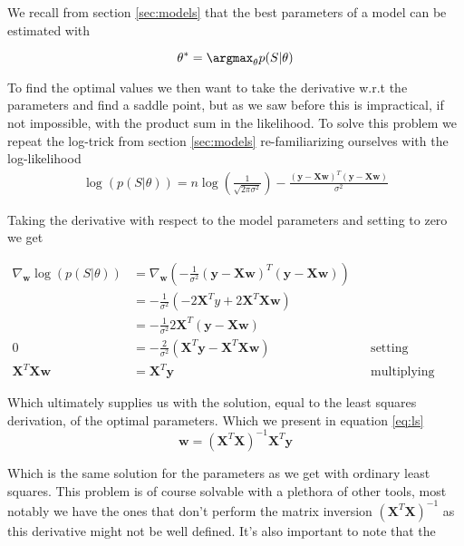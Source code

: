 \noindent We recall from section \ref{sec:models} that the best parameters of a model can be estimated with 

\begin{equation}
\mathbf{\theta}^* = \argmax_\mathbf{\theta} p(S|\mathbf{\theta})
\end{equation}

\noindent To find the optimal values we then want to take the derivative w.r.t the parameters and find a saddle point, but as we saw before this is impractical, if not impossible, with the product sum in the likelihood. To solve this problem we repeat the log-trick from section \ref{sec:models} re-familiarizing ourselves with the log-likelihood
\begin{align}
\log(p(S|\theta)) = n \log(\frac{1}{\sqrt{2\pi \sigma^2}}) - \frac{(\mathbf{y} - \mathbf{X}\mathbf{w})^T(\mathbf{y} - \mathbf{X}\mathbf{w})}{\sigma^2}
\end{align}

\noindent Taking the derivative with respect to the model parameters and setting to zero we get

\begin{align*}
\nabla_\mathbf{w} \log(p(S|\theta)) &=\nabla_\mathbf{w}\left( - \frac{1}{\sigma^2} (\mathbf{y} - \mathbf{X}\mathbf{w})^T(\mathbf{y} - \mathbf{X}\mathbf{w}) \right) \\
&=  - \frac{1}{\sigma^2}(-2\mathbf{X}^Ty + 2\mathbf{X}^T\mathbf{X}\mathbf{w}) \\
&= -\frac{1}{\sigma^2} 2 \mathbf{X}^T(\mathbf{y}- \mathbf{X}\mathbf{w}) \\
0 & = -\frac{2}{\sigma^2}(\mathbf{X}^T\mathbf{y} - \mathbf{X}^T\mathbf{Xw})&& \text{setting derivative to zero} \\
\mathbf{X}^T\mathbf{Xw} &= \mathbf{X}^T\mathbf{y}  && \text{multiplying away constants} 
\end{align*}

\noindent Which ultimately supplies us with the solution, equal to the least squares derivation, of the optimal parameters. Which we present in equation \ref{eq:ls}
\begin{equation}\label{eq:ls}
\mathbf{w}= (\mathbf{X}^T \mathbf{X})^{-1}\mathbf{X}^T\mathbf{y} 
\end{equation}


\noindent Which is the same solution for the parameters as we get with ordinary least squares. This problem is of course solvable with a plethora of other tools, most notably we have the ones that don't perform the matrix inversion $(\mathbf{X}^T \mathbf{X})^{-1}$ as this derivative might not be well defined. It's also important to note that the 